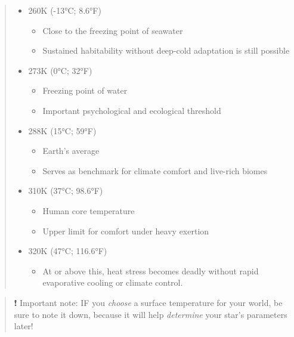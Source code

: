 \documentclass[
  letterpaper,
]{book}
\providecommand{\tightlist}{%
  \setlength{\itemsep}{0pt}\setlength{\parskip}{0pt}}
\begin{document}
\begin{quote}
\begin{itemize}
\tightlist
\item
  260K (-13°C; 8.6°F)

  \begin{itemize}
  \tightlist
  \item
    Close to the freezing point of seawater
  \item
    Sustained habitability without deep-cold adaptation is still
    possible
  \end{itemize}
\item
  273K (0°C; 32°F)

  \begin{itemize}
  \tightlist
  \item
    Freezing point of water
  \item
    Important psychological and ecological threshold
  \end{itemize}
\item
  288K (15°C; 59°F)

  \begin{itemize}
  \tightlist
  \item
    Earth's average
  \item
    Serves as benchmark for climate comfort and live-rich biomes
  \end{itemize}
\item
  310K (37°C; 98.6°F)

  \begin{itemize}
  \tightlist
  \item
    Human core temperature
  \item
    Upper limit for comfort under heavy exertion
  \end{itemize}
\item
  320K (47°C; 116.6°F)

  \begin{itemize}
  \tightlist
  \item
    At or above this, heat stress becomes deadly without rapid
    evaporative cooling or climate control.
  \end{itemize}
\end{itemize}
\end{quote}

\begin{quote}
❗️ Important note: IF you \emph{choose} a surface temperature for your
world, be sure to note it down, because it will help \emph{determine}
your star's parameters later!
\end{quote}
\end{document}
